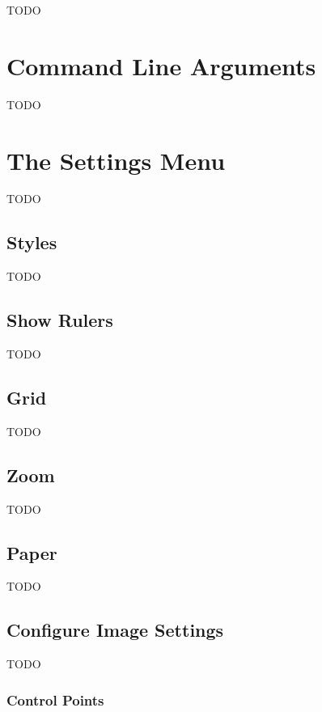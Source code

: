 TODO

\section{Command Line Arguments}\label{sec:cmdargs}

TODO

\section{The Settings Menu}\label{sec:settingsmenu}

TODO

\subsection{Styles}\label{sec:setcurrentstyles}

TODO

\subsection{Show Rulers}\label{sec:showrulers}

TODO

\subsection{Grid}\label{sec:gridmenu}

TODO

\subsection{Zoom}\label{sec:zoommenu}

TODO


\subsection{Paper}\label{sec:papermenu}

TODO


\subsection{Configure Image Settings}\label{sec:configuredialog}

TODO


\subsubsection{Control Points}\label{sec:controlsettings}

